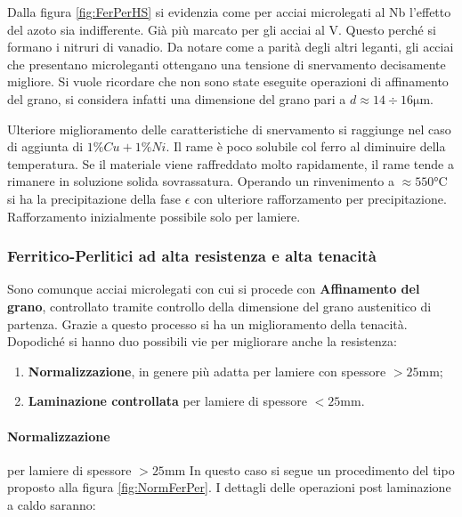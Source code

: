 Dalla figura \ref{fig:FerPerHS} si evidenzia come per acciai microlegati
al Nb l'effetto del azoto sia indifferente. Già più marcato per gli 
acciai al V. Questo perché si formano i nitruri di vanadio.
Da notare come a parità degli altri leganti, gli acciai che presentano
microleganti ottengano una tensione di snervamento decisamente migliore.
Si vuole ricordare che non sono state eseguite operazioni di affinamento 
del grano, si considera infatti una dimensione del grano pari a $d 
\approx 14 \div 16\unit{\um}$.

Ulteriore miglioramento delle caratteristiche di snervamento si 
raggiunge nel caso di aggiunta di $1\%Cu + 1\%Ni$.
Il rame è poco solubile col ferro al diminuire della temperatura.
Se il materiale viene raffreddato molto rapidamente, il rame tende a 
rimanere in soluzione solida sovrassatura.
Operando un rinvenimento a $\approx 550\unit{\celsius}$ si ha la 
precipitazione della fase $\epsilon$ con ulteriore rafforzamento per 
precipitazione.
Rafforzamento inizialmente possibile solo per lamiere.

\subsubsection{Ferritico-Perlitici ad alta resistenza e alta tenacità}
Sono comunque acciai microlegati con cui si procede con 
\textbf{Affinamento del grano}, controllato tramite controllo della
dimensione del grano austenitico di partenza.
Grazie a questo processo si ha un miglioramento della tenacità.
Dopodiché si hanno duo possibili vie per migliorare anche la resistenza:
\begin{enumerate}
\item \textbf{Normalizzazione}, in genere più adatta per lamiere con 
spessore $>25\unit{\mm}$;
\item \textbf{Laminazione controllata} per lamiere di spessore 
$<25\unit{\mm}$.
\end{enumerate}

\paragraph*{Normalizzazione} per lamiere di spessore $>25\unit{\mm}$
In questo caso si segue un procedimento del tipo proposto alla figura \ref{fig:NormFerPer}.
I dettagli delle operazioni post laminazione a caldo saranno:

